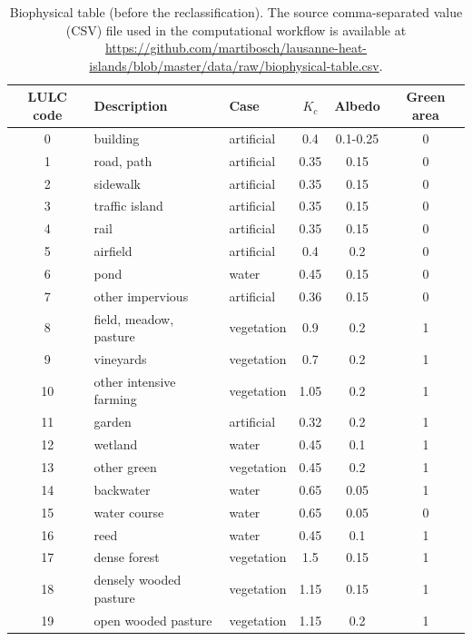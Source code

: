 \documentclass[10pt,letterpaper]{article}
\begin{document}
\begin{table}[!h]
  \begin{adjustwidth}{-.1\textwidth}{0cm}
    \caption{\label{tab:si-biophysical-table} Biophysical table (before the reclassification). The source comma-separated value (CSV) file used in the computational workflow is available at \url{https://github.com/martibosch/lausanne-heat-islands/blob/master/data/raw/biophysical-table.csv}.}
    \begin{center}
      \begin{tabular}{ c p{} p{} c c c }
        \toprule
        LULC code & Description & Case & $K_c$ & Albedo & Green area \\
        \midrule
        0 & building & artificial & 0.4 & 0.1-0.25 & 0 \\ %
        1 & road, path & artificial & 0.35 & 0.15 & 0 \\ %
        2 & sidewalk & artificial & 0.35 & 0.15 & 0 \\
        3 & traffic island & artificial & 0.35 & 0.15 & 0 \\
        4 & rail & artificial & 0.35 & 0.15 & 0 \\
        5 & airfield & artificial & 0.4 & 0.2 & 0 \\
        6 & pond & water & 0.45 & 0.15 & 0 \\
        7 & other impervious & artificial & 0.36 & 0.15 & 0 \\
        8 & field, meadow, pasture & vegetation & 0.9 & 0.2 & 1 \\
        9 & vineyards & vegetation & 0.7 & 0.2 & 1 \\
        10 & other intensive farming & vegetation & 1.05 & 0.2 & 1 \\
        11 & garden & artificial & 0.32 & 0.2 & 1 \\
        12 & wetland & water & 0.45 & 0.1 & 1 \\
        13 & other green & vegetation & 0.45 & 0.2 & 1 \\
        14 & backwater & water & 0.65 & 0.05 & 1 \\
        15 & water course & water & 0.65 & 0.05 & 0\\
        16 & reed & water & 0.45 & 0.1 & 1\\
        17 & dense forest & vegetation & 1.5 & 0.15 & 1 \\
        18 & densely wooded pasture & vegetation & 1.15 & 0.15 & 1 \\
        19 & open wooded pasture & vegetation & 1.15 & 0.2 & 1 \\

\end{tabular}
\end{center}
\end{adjustwidth}
\end{table}
\end{document}
